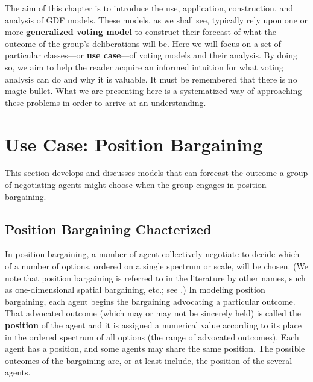 The aim of this chapter is to introduce the use, application,  construction, and analysis of GDF models. These models, as we shall see, typically rely upon one or more {\bf  {generalized voting model}} to construct their   {forecast} of what the   {outcome} of the group's deliberations will be. Here we will focus on a set of particular classes---or {\bf  {use case}}---of voting models and their analysis. By doing so, we aim to help the reader acquire an informed intuition for  what voting analysis can do and why it is valuable. It must be remembered that there is no magic bullet. What we are presenting here is a systematized way of approaching these problems in order to arrive at an understanding.

\section{Use Case: Position Bargaining}



This section develops and discusses models that can forecast the outcome %
 a group of negotiating agents might choose when the group engages in position bargaining.
\subsection{Position Bargaining Chacterized}

In  position bargaining,  a number of   {agent} collectively negotiate to decide which of a number of options, ordered on a single spectrum or scale, will be chosen. (We note that  position bargaining  is referred to in the literature  by other names, such as one-dimensional spatial bargaining, etc.; see  \cite[\S\S5--6]{wise_ben_3June2014}.)
In modeling position bargaining, each agent begins the bargaining advocating a particular outcome.  That advocated  outcome (which may or may not be sincerely held) is called the {\bf  {position}} of the agent and it is assigned a numerical value according to its place in the ordered spectrum of all options (the range of advocated outcomes). %
Each agent has a   {position}, and some agents may share the same   {position}. The possible outcomes of the bargaining are, or at least include, the   {position} of the several agents. 

